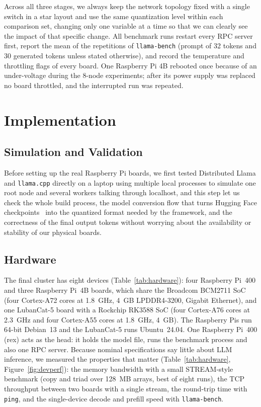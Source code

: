 \documentclass[11pt,a4paper]{article}
\begin{document}
Across all three stages, we always keep the network topology fixed with a single switch in a star layout and use the same quantization level within each comparison set, changing only one variable at a time so that we can clearly see the impact of that specific change. All benchmark runs restart every RPC server first, report the mean of the repetitions of \texttt{llama-bench} (prompt of 32 tokens and 30 generated tokens unless stated otherwise), and record the temperature and throttling flags of every board. One Raspberry Pi 4B rebooted once because of an under-voltage during the 8-node experiments; after its power supply was replaced no board throttled, and the interrupted run was repeated.

\section{Implementation}\label{sec:n7}

\subsection{Simulation and Validation}\label{sec:n7_1}

Before setting up the real Raspberry Pi boards, we first tested Distributed Llama and \texttt{llama.cpp} directly on a laptop using multiple local processes to simulate one root node and several workers talking through localhost, and this step let us check the whole build process, the model conversion flow that turns Hugging Face checkpoints~\cite{huggingface} into the quantized format needed by the framework, and the correctness of the final output tokens without worrying about the availability or stability of our physical boards.

\subsection{Hardware}\label{sec:hardware}

The final cluster has eight devices (Table~\ref{tab:hardware}): four Raspberry Pi~400 and three Raspberry Pi~4B boards, which share the Broadcom BCM2711 SoC (four Cortex-A72 cores at 1.8~GHz, 4~GB LPDDR4-3200, Gigabit Ethernet), and one LubanCat-5 board with a Rockchip RK3588 SoC (four Cortex-A76 cores at 2.3~GHz and four Cortex-A55 cores at 1.8~GHz, 4~GB). The Raspberry Pis run 64-bit Debian~13 and the LubanCat-5 runs Ubuntu~24.04. One Raspberry Pi~400 (rex) acts as the head: it holds the model file, runs the benchmark process and also one RPC server. Because nominal specifications say little about LLM inference, we measured the properties that matter (Table~\ref{tab:hardware}, Figure~\ref{fig:devperf}): the memory bandwidth with a small STREAM-style benchmark (copy and triad over 128~MB arrays, best of eight runs), the TCP throughput between two boards with a single stream, the round-trip time with \texttt{ping}, and the single-device decode and prefill speed with \texttt{llama-bench}.
\end{document}
